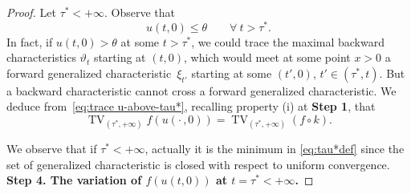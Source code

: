 \documentclass[a4paper, 10pt, final]{article}
\DeclareMathOperator{\tv}{TV}
\begin{document}
\begin{proof}
Let $\tau^*<+\infty$. 
Observe that 
  \begin{equation}
  \label{eq:trace u-above-tau*}
      u(t,0)\leq \theta\qquad\forall~t>\tau^*.
  \end{equation}
  In fact, if $u(t,0)> \theta$ 
  at some $t>\tau^*$, we could trace the maximal backward characteristics $\vartheta_t$ starting at $(t,0)$,
  which would meet at some point $x>0$
  a forward generalized characteristic~$\xi_{t'}$ starting at some $(t',0)$,
  $t'\in (\tau^*,t)$.
  But a backward characteristic
  cannot cross a forward generalized characteristic.
  We deduce from~\eqref{eq:trace u-above-tau*}, recalling  property (i)  at {\bf Step 1}, that 
  \begin{equation}
  \label{eq:tvf-tau^*}
      \tv_{(\tau^*, +\infty)} f( u(\cdot\,, 0))
      =
      \tv_{(\tau^*, +\infty)} (f\circ k).
  \end{equation}

  We observe that if $\tau^*<+\infty$, actually it is the minimum in \eqref{eq:tau*def} since the set of generalized characteristic is closed with respect to uniform convergence. \\
  \noindent
  {\bf Step 4. The variation of  $f(u(t, 0))$ at $t=\tau^*<+\infty$.} 


\end{proof}
\end{document}
